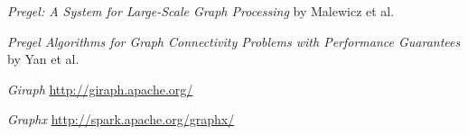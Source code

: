 {
    \emph{Pregel: A System for Large-Scale Graph Processing} by Malewicz et al.

    \vfill

    \emph{Pregel Algorithms for Graph Connectivity Problems with
Performance Guarantees} by Yan et al.
	\vfill
	
	\emph{Giraph} \url{http://giraph.apache.org/}
	
	\vfill
	
	\emph{Graphx} \url{http://spark.apache.org/graphx/}
}


